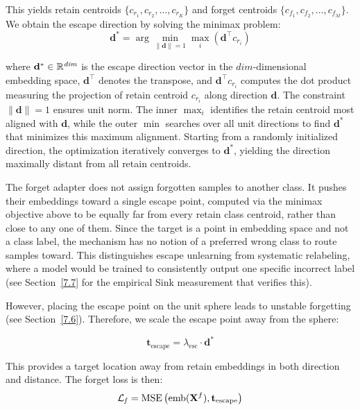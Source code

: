 This yields retain centroids $\{c_{r_1}, c_{r_2}, \dots, c_{r_K}\}$ and forget centroids $\{c_{f_1}, c_{f_2}, \dots, c_{f_M}\}$. We obtain the escape direction by solving the minimax problem:
\begin{equation}
\mathbf{d}^* = \arg\min_{\|\mathbf{d}\|=1} \max_{i} \left( \mathbf{d}^\top c_{r_i} \right)
\end{equation}

where $\mathbf{d}^* \in \mathbb{R}^{\text{\textit{dim}}}$ is the escape direction vector in the $\textit{dim}$-dimensional embedding space, $\mathbf{d}^\top$ denotes the transpose, and $\mathbf{d}^\top c_{r_i}$ computes the dot product measuring the projection of retain centroid $c_{r_i}$ along direction $\mathbf{d}$. The constraint $\|\mathbf{d}\|=1$ ensures unit norm. The inner $\max_i$ identifies the retain centroid most aligned with $\mathbf{d}$, while the outer $\min$ searches over all unit directions to find $\mathbf{d}^*$ that minimizes this maximum alignment. Starting from a randomly initialized direction, the optimization iteratively converges to $\mathbf{d}^*$, yielding the direction maximally distant from all retain centroids.

The forget adapter does not assign forgotten samples to another class. It pushes their embeddings toward a single escape point, computed via the minimax objective above to be equally far from every retain class centroid, rather than close to any one of them. Since the target is a point in embedding space and not a class label, the mechanism has no notion of a preferred wrong class to route samples toward. This distinguishes escape unlearning from systematic relabeling, where a model would be trained to consistently output one specific incorrect label (see Section~\ref{7.7} for the empirical Sink measurement that verifies this).

However, placing the escape point on the unit sphere leads to unstable forgetting (see Section~\ref{7.6}). Therefore, we scale the escape point away from the sphere:

\begin{equation}
\mathbf{t}_{\text{escape}} = \lambda_{\text{esc}} \cdot \mathbf{d}^*
\end{equation}

This provides a target location away from retain embeddings in both direction and distance. The forget loss is then:
\begin{equation}
\mathcal{L}_{\text{\textit{f}}} = \text{MSE}\left( \text{emb}(\mathbf{X}^f), \mathbf{t}_{\text{escape}} \right)
\end{equation}

